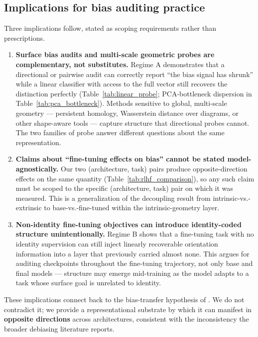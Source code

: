 \documentclass[11pt]{article}
\begin{document}
\subsection{Implications for bias auditing practice}\label{sec:implications}

Three implications follow, stated as scoping requirements rather than prescriptions.

\begin{enumerate}
\item \textbf{Surface bias audits and multi-scale geometric probes are complementary, not substitutes.} Regime A demonstrates that a directional or pairwise audit can correctly report ``the bias signal has shrunk'' while a linear classifier with access to the full vector still recovers the distinction perfectly (Table~\ref{tab:linear_probe}; PCA-bottleneck dispersion in Table~\ref{tab:pca_bottleneck}). Methods sensitive to global, multi-scale geometry --- persistent homology, Wasserstein distance over diagrams, or other shape-aware tools --- capture structure that directional probes \citep{bolukbasi2016man, caliskan2017semantics, may-etal-2019-measuring} cannot. The two families of probe answer different questions about the same representation.

\item \textbf{Claims about ``fine-tuning effects on bias'' cannot be stated model-agnostically.} Our two (architecture, task) pairs produce opposite-direction effects on the same quantity (Table~\ref{tab:rlhf_comparison}), so any such claim must be scoped to the specific (architecture, task) pair on which it was measured. This is a generalization of the \citet{goldfarb-tarrant-etal-2021-intrinsic} decoupling result from intrinsic-vs.-extrinsic to base-vs.-fine-tuned within the intrinsic-geometry layer.

\item \textbf{Non-identity fine-tuning objectives can introduce identity-coded structure unintentionally.} Regime B shows that a fine-tuning task with no identity supervision can still inject linearly recoverable orientation information into a layer that previously carried almost none. This argues for auditing checkpoints throughout the fine-tuning trajectory, not only base and final models --- structure may emerge mid-training as the model adapts to a task whose surface goal is unrelated to identity.
\end{enumerate}

These implications connect back to the bias-transfer hypothesis of \citet{steed-etal-2022-upstream}. We do not contradict it; we provide a representational substrate by which it can manifest in \textbf{opposite directions} across architectures, consistent with the inconsistency the broader debiasing literature reports.
\end{document}
